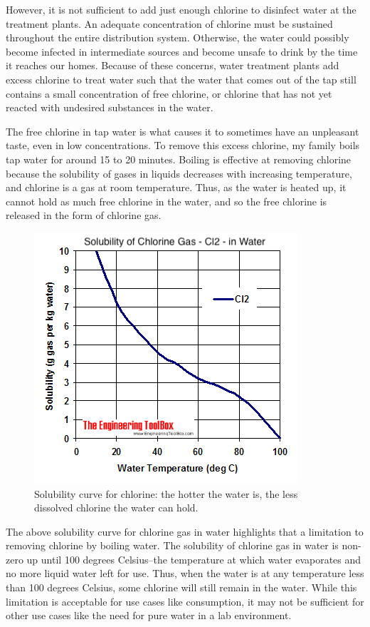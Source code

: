 \documentclass[11pt]{article}
\begin{document}
However, it is not sufficient to add just enough chlorine to disinfect water at the treatment plants. An adequate concentration of chlorine must be sustained throughout the entire distribution system. Otherwise, the water could possibly become infected in intermediate sources and become unsafe to drink by the time it reaches our homes. Because of these concerns, water treatment plants add excess chlorine to treat water such that the water that comes out of the tap still contains a small concentration of free chlorine, or chlorine that has not yet reacted with undesired substances in the water.

The free chlorine in tap water is what causes it to sometimes have an unpleasant taste, even in low concentrations. To remove this excess chlorine, my family boils tap water for around 15 to 20 minutes. Boiling is effective at removing chlorine because the solubility of gases in liquids decreases with increasing temperature, and chlorine is a gas at room temperature. Thus, as the water is heated up, it cannot hold as much free chlorine in the water, and so the free chlorine is released in the form of chlorine gas.

\begin{figure}[H]
	\centering
	\caption{Solubility curve for chlorine: the hotter the water is, the less dissolved chlorine the water can hold.}
	\includegraphics[width=0.5\linewidth]{assets/cl-solubility.png}
\end{figure}

The above solubility curve for chlorine gas in water highlights that a limitation to removing chlorine by boiling water. The solubility of chlorine gas in water is non-zero up until 100 degrees Celsius--the temperature at which water evaporates and no more liquid water left for use. Thus, when the water is at any temperature less than 100 degrees Celsius, some chlorine will still remain in the water. While this limitation is acceptable for use cases like consumption, it may not be sufficient for other use cases like the need for pure water in a lab environment.
\end{document}
